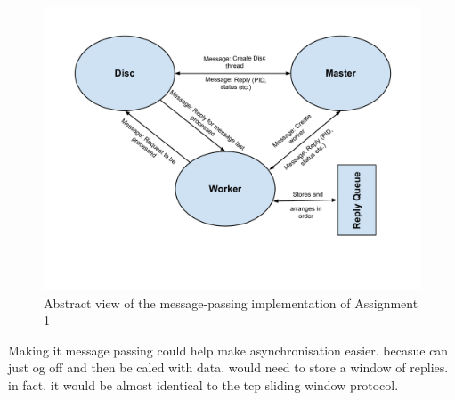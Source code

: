\documentclass[12pt]{article}
\begin{document}
\begin{figure}
\centering
\includegraphics[width=18cm]{message-passing.pdf}
\caption{Abstract view of the message-passing implementation of Assignment 1}
\label{fig:message-passing}
\end{figure}

Making it message passing could help make asynchronisation easier. becasue can just og off and then be caled with data. would need to store a window of replies. in fact. it would be almost identical to the tcp sliding window protocol.
\end{document}
